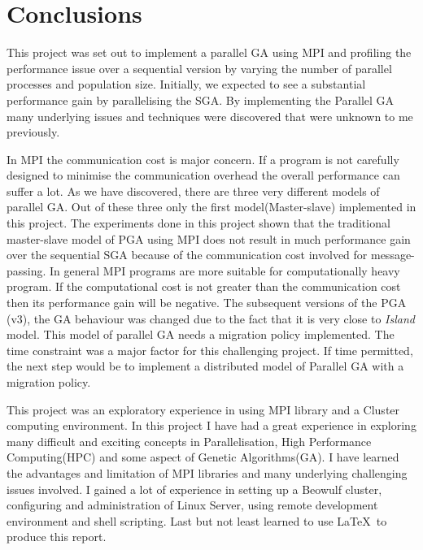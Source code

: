 \chapter{Conclusions}
\label{conclusions}
This project was set out to implement a parallel GA using MPI and profiling the performance issue over a sequential version by varying the number of parallel processes and population size. Initially, we expected to see a substantial performance gain by parallelising the SGA. By implementing the Parallel GA many underlying issues and techniques were discovered that were unknown to me previously. 

In MPI the communication cost is major concern. If a program is not carefully designed to minimise the communication overhead the overall performance can suffer a lot. As we have discovered, there are three very different models of parallel GA. Out of these three only the first model(Master-slave) implemented in this project. The experiments done in this project shown that the traditional master-slave model of PGA using MPI does not result in much performance gain over the sequential SGA because of the communication cost involved for message-passing. In general MPI programs are more suitable for computationally heavy program. If the computational cost is not greater than the communication cost then its performance gain will be negative. The subsequent versions of the PGA (v3), the GA behaviour was changed due to the fact that it is very close to \textit{Island} model. This model of parallel GA needs a migration policy implemented. The time constraint was a major factor for this challenging project. If time permitted, the next step would be to implement a distributed model of Parallel GA with a migration policy.


This project was an exploratory experience in using MPI library and a Cluster computing environment. In this project I have had a great experience in exploring many difficult and exciting concepts in Parallelisation, High Performance Computing(HPC) and some aspect of Genetic Algorithms(GA). I have learned the advantages and limitation of MPI libraries and many underlying challenging issues involved. I gained a lot of experience in setting up a Beowulf cluster, configuring and administration of Linux Server, using remote development environment and shell scripting. Last but not least learned to use \LaTeX\  to produce this report. 